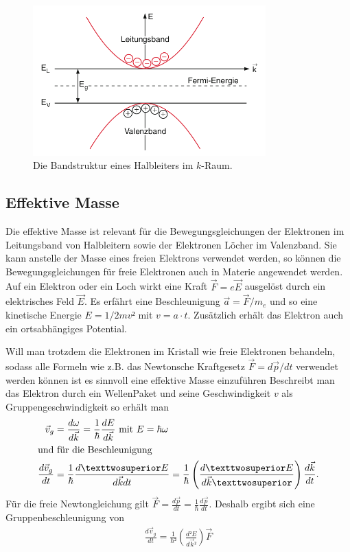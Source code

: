 
\begin{figure}
	\centering
	\includegraphics[width=0.8\textwidth]{./Bilder/bandstrukt.png}
	\caption{Die Bandstruktur eines Halbleiters im $k$-Raum\cite{book:expi3}.}\label{fig:band}
\end{figure}

\subsection{Effektive Masse \cite[][Kap. 14]{book:expi3}}

Die effektive Masse ist relevant für die Bewegungsgleichungen der Elektronen im
Leitungsband von Halbleitern sowie der Elektronen Löcher im Valenzband. Sie
kann anstelle der Masse eines freien Elektrons verwendet werden, so können die
Bewegungsgleichungen für freie Elektronen auch in Materie angewendet werden.
Auf ein Elektron oder ein Loch wirkt eine Kraft $\vec{F} = e \vec{E}$ ausgelöst
durch ein elektrisches Feld $\vec{E}$. Es erfährt eine Beschleunigung $\vec{a}
	= \vec{F}/m_e$ und so eine kinetische Energie $E = 1/2 m v²$ mit $v= a\cdot t$.
Zusätzlich erhält das Elektron auch ein ortsabhängiges Potential.

Will man trotzdem die Elektronen im Kristall wie freie Elektronen behandeln,
sodass alle Formeln wie z.B. das Newtonsche Kraftgesetz $\vec{F} = d\vec{p}/dt$
verwendet werden können ist es sinnvoll eine effektive Masse einzuführen
Beschreibt man das Elektron durch ein WellenPaket und seine Geschwindigkeit $v$
als Gruppengeschwindigkeit so erhält man
\begin{align}
	\vec{v}_g             & = \frac{d\omega}{d\vec{k}} = \frac{1}{\hbar} \frac{dE}{d\vec{k}} \t{ mit } E = \hbar \omega                        \\
	\intertext{und für die Beschleunigung}
	\frac{d\vec{v}_g}{dt} & = \frac{1}{\hbar} \frac{d²E}{d\vec{k} dt} = \frac{1}{\hbar} \left(\frac{d²E}{d\vec{k}²}\right)\frac{d\vec{k}}{dt}.
\end{align}
Für die freie Newtongleichung gilt $\vec{F} = \frac{d\vec{p}}{dt} =\frac{1}{\hbar}\frac{d\vec{p}}{dt} $.
Deshalb ergibt sich eine Gruppenbeschleunigung von
\begin{align}
	\frac{d\vec{v}_g}{dt} = \frac{1}{\hbar²} \left(\frac{d²E}{d\vec{k}²}\right) \vec{F}
\end{align}

